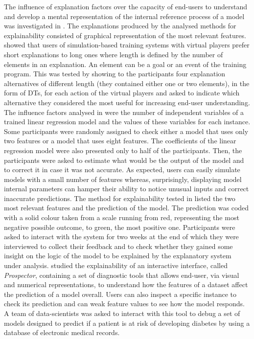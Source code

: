 \documentclass[final,1p,times]{elsarticle}
\begin{document}
The influence of explanation factors over the capacity of end-users to understand and develop a mental representation of the internal reference process of a model was investigated in \cite{harbers2010guidelines, harbers2010design, poursabzi2018manipulating, tullio2007works}. The explanations produced by the analysed methods for explainability consisted of graphical representation of the most relevant features. \cite{harbers2010guidelines, harbers2010design} showed that users of simulation-based training systems with virtual players prefer short explanations to long ones where length is defined by the number of elements in an explanation. An element can be a goal or an event of the training program. This was tested by showing to the participants four explanation alternatives of different length (they contained either one or two elements), in the form of DTs, for each action of the virtual players and asked to indicate which alternative they considered the most useful for increasing end-user understanding. The influence factors analysed in \cite{poursabzi2018manipulating} were the number of independent variables of a trained linear regression model and the values of these variables for each instance. Some participants were randomly assigned to check either a model that uses only two features or a model that uses eight features. The coefficients of the linear regression model were also presented only to half of the participants. Then, the participants were asked to estimate what would be the output of the model and to correct it in case it was not accurate. As expected, users can easily simulate models with a small number of features whereas, surprisingly, displaying model internal parameters can hamper their ability to notice unusual inputs and correct inaccurate predictions. The method for explainability tested in \cite{tullio2007works} listed the two most relevant features and the prediction of the model. The prediction was coded with a solid colour taken from a scale running from red, representing the most negative possible outcome, to green, the most positive one. Participants were asked to interact with the system for two weeks at the end of which they were interviewed to collect their feedback and to check whether they gained some insight on the logic of the model to be explained by the explanatory system under analysis.
\cite{krause2016interacting} studied the explainability of an interactive interface, called \textit{Prospector}, containing a set of diagnostic tools that allows end-user, via visual and numerical representations, to understand how the features of a dataset affect the prediction of a model overall. Users can also inspect a specific instance to check its prediction and can weak feature values to see how the model responds. A team of data-scientists was asked to interact with this tool to debug a set of models designed to predict if a patient is at risk of developing diabetes by using a database of electronic medical records. 
\end{document}
